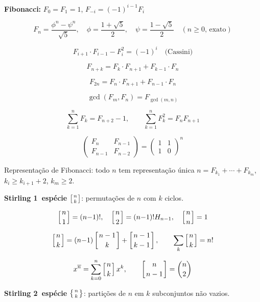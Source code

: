 \textbf{Fibonacci:} $F_0=F_1=1$, $F_{-i}=(-1)^{i-1}F_i$
{\setlength{\abovedisplayskip}{-1pt}\setlength{\belowdisplayskip}{-1pt}

\[F_n = \frac{\phi^n-\psi^n}{\sqrt{5}}, \quad \phi=\frac{1+\sqrt5}{2}, \quad \psi=\frac{1-\sqrt5}{2} \quad (n \geq 0\text{, exato})\]

\[F_{i+1}\cdot F_{i-1}-F_i^2 = (-1)^i \quad\text{(Cassini)}\]

\[F_{n+k}=F_k\cdot F_{n+1}+F_{k-1}\cdot F_n\]

\[F_{2n}=F_n\cdot F_{n+1}+F_{n-1}\cdot F_n\]

\[\gcd(F_m,F_n)=F_{\gcd(m,n)}\]

\vspace{-12pt}

\[\sum_{k=1}^nF_k = F_{n+2}-1, \qquad \sum_{k=1}^nF_k^2 = F_nF_{n+1}\]

\vspace{-6pt}

\[\begin{pmatrix}F_n&F_{n-1}\\F_{n-1}&F_{n-2}\end{pmatrix} = \begin{pmatrix}1&1\\1&0\end{pmatrix}^n\]

\vspace{0pt}

} %
Representação de Fibonacci: todo $n$ tem representação única $n=F_{k_1}+\cdots+F_{k_m}$, $k_i\geq k_{i+1}+2$, $k_m\geq2$.

\vspace{16pt}

\textbf{Stirling 1\textordfeminine\ espécie} $\left[{n\atop k}\right]$: permutações de $n$ com $k$ ciclos.

\[\left[{n\atop 1}\right]=(n{-}1)!, \quad \left[{n\atop 2}\right]=(n{-}1)!H_{n-1}, \quad \left[{n\atop n}\right]=1\]

\[\left[{n\atop k}\right]=(n{-}1)\left[{n-1\atop k}\right]+\left[{n-1\atop k-1}\right], \qquad \sum_k\left[{n\atop k}\right]=n!\]

\[x^{\overline{n}}=\sum_{k=0}^n\left[{n\atop k}\right]x^k, \qquad \left[{n\atop n-1}\right]=\binom{n}{2}\]

\vspace{32pt}

\textbf{Stirling 2\textordfeminine\ espécie} $\left\{{n\atop k}\right\}$: partições de $n$ em $k$ subconjuntos não vazios.

